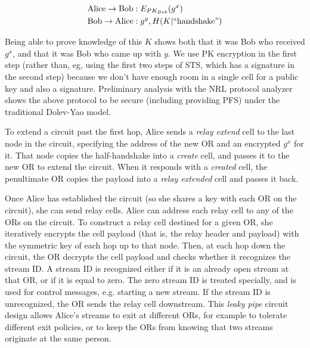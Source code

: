 \documentclass[times,10pt,twocolumn]{article}
\begin{document}
\begin{equation}
\begin{aligned}
\mathrm{Alice} \rightarrow \mathrm{Bob}&: E_{PK_{Bob}}(g^x) \\
\mathrm{Bob} \rightarrow \mathrm{Alice}&: g^y, H(K | \mathrm{``handshake"}) \\
\end{aligned}
\end{equation}

Being able to prove knowledge of this $K$ shows both that it was Bob
who received $g^x$, and that it was Bob who came up with $y$. We use
PK encryption in the first step (rather than, eg, using the first two
steps of STS, which has a signature in the second step) because we
don't have enough room in a single cell for a public key and also a
signature. Preliminary analysis with the NRL protocol analyzer shows
the above protocol to be secure (including providing PFS) under the
traditional Dolev-Yao model.

To extend a circuit past the first hop, Alice sends a \emph{relay extend}
cell to the last node in the circuit, specifying the address of the new
OR and an encrypted $g^x$ for it. That node copies the half-handshake
into a \emph{create} cell, and passes it to the new OR to extend the
circuit. When it responds with a \emph{created} cell, the penultimate OR
copies the payload into a \emph{relay extended} cell and passes it back.

Once Alice has established the circuit (so she shares a key with each
OR on the circuit), she can send relay cells.
Alice can address each relay cell to any of the ORs on the circuit. To
construct a relay cell destined for a given OR, she iteratively
encrypts the cell payload (that is, the relay header and payload)
with the symmetric key of each hop up to that node. Then, at each hop
down the circuit, the OR decrypts the cell payload and checks whether
it recognizes the stream ID. A stream ID is recognized either if it
is an already open stream at that OR, or if it is equal to zero. The
zero stream ID is treated specially, and is used for control messages,
e.g.  starting a new stream. If the stream ID is unrecognized, the OR
sends the relay cell downstream. This \emph{leaky pipe} circuit design
allows Alice's streams to exit at different ORs, for example to tolerate
different exit policies, or to keep the ORs from knowing that two streams
originate at the same person.
\end{document}
